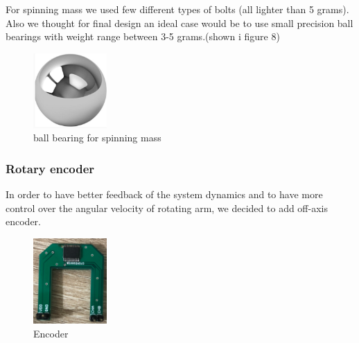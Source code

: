 For spinning mass we used few different types of bolts (all lighter than 5 grams). Also we thought for final design an ideal case would be to use small precision ball bearings with weight range between 3-5 grams.(shown i figure 8)
\begin{figure}[h]
\centering
\includegraphics[width=0.25\textwidth]{./Amir_img/spinningMass.png}
\caption{ball bearing for spinning mass}
\end{figure}


\subsubsection{Rotary encoder }

In order to have better feedback of the system dynamics and to have more control over the angular velocity of rotating arm, we decided to add off-axis encoder.
\begin{figure}[H]
\centering
\includegraphics[width=0.25\textwidth]{./Amir_img/enc1.png}
\caption{Encoder}
\end{figure}

